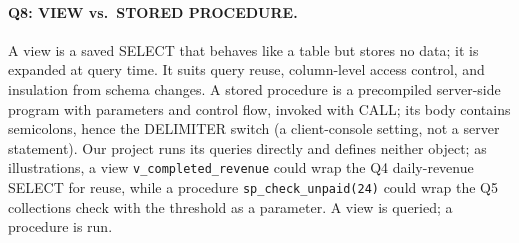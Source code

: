 \paragraph{Q8: VIEW vs.\ STORED PROCEDURE.}
A view is a saved SELECT that behaves like a table but stores no data; it is expanded at query time. It suits query reuse, column-level access control, and insulation from schema changes. A stored procedure is a precompiled server-side program with parameters and control flow, invoked with CALL; its body contains semicolons, hence the DELIMITER switch (a client-console setting, not a server statement). Our project runs its queries directly and defines neither object; as illustrations, a view \texttt{v\_completed\_revenue} could wrap the Q4 daily-revenue SELECT for reuse, while a procedure \texttt{sp\_check\_unpaid(24)} could wrap the Q5 collections check with the threshold as a parameter. A view is queried; a procedure is run.
